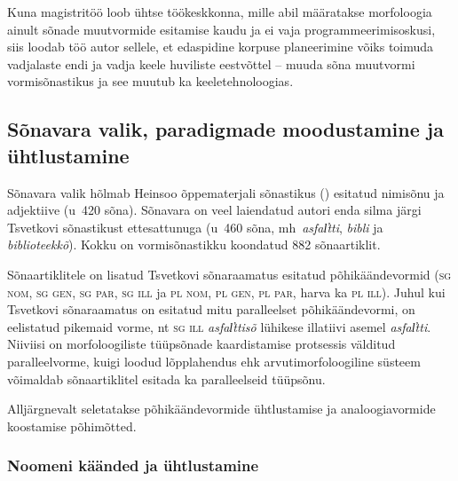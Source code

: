 \documentclass[12pt,a4paper]{article}
\newcommand{\vadja}[1]{\textit{#1}}
\newcommand{\msd}[1]{\textsc{#1}}
\begin{document}
Kuna magistritöö loob ühtse töökeskkonna, mille abil määratakse morfoloogia ainult sõnade muut\-vormide esitamise kaudu ja ei vaja programmeerimis\-oskusi, siis loodab töö autor sellele, et edaspidine korpuse planeerimine võiks toimuda vadjalaste endi ja vadja keele huviliste eestvõttel -- muuda sõna muutvormi vormi\-sõnastikus ja see muutub ka keele\-tehnoloogias.



\subsection{Sõnavara valik, paradigmade moodustamine ja ühtlustamine}
\label{sec:sõnavara-valik}

Sõnavara valik hõlmab Heinsoo õppematerjali sõnastikus (\citeyear{heinsoo_vaddsonakopittoja_2015}) esitatud nimi\-sõnu ja adjektiive (u~420 sõna). Sõnavara on veel laiendatud autori enda silma järgi Tsvetkovi sõnastikust ettesattunuga (u~460 sõna, mh~\vadja{asfal̕tti}, \vadja{bibli} ja \vadja{biblioteekkõ}). Kokku on vormi\-sõnastikku koondatud 882 sõna\-artiklit.

Sõnaartiklitele on lisatud Tsvetkovi sõnaraamatus esitatud põhi\-käände\-vormid (\msd{sg nom}, \msd{sg gen}, \msd{sg par}, \msd{sg ill} ja  \msd{pl nom}, \msd{pl gen}, \msd{pl par}, harva ka \msd{pl ill}). Juhul kui Tsvetkovi sõna\-raamatus on esitatud mitu paralleelset põhikäändevormi, on eelistatud pikemaid vorme, nt \msd{sg ill} \vadja{asfal̕ttisõ} lühikese illatiivi asemel \vadja{asfal̕tti}. Niiviisi on morfoloogiliste tüüpsõnade kaardistamise protsessis välditud paralleelvorme, kuigi loodud lõpplahendus ehk arvutimorfoloogiline süsteem võimaldab sõna\-artiklitel esitada ka paralleelseid tüüpsõnu. %


Alljärgnevalt seletatakse põhikäändevormide ühtlustamise ja analoogiavormide koostamise põhimõtted. %


\subsubsection{Noomeni käänded ja ühtlustamine}
\end{document}

